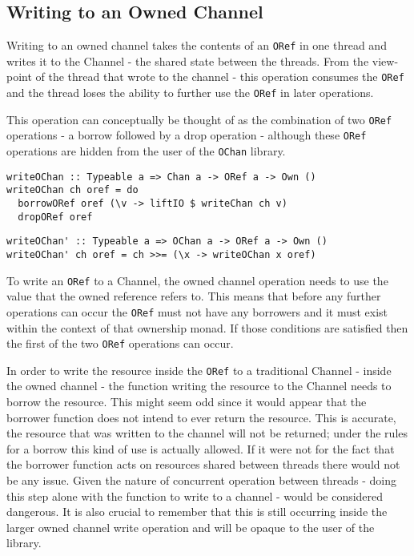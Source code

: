 \documentclass[onehalf,11pt]{beavtex}
\begin{document}
\subsection{Writing to an Owned Channel}

Writing to an owned channel takes the contents of an \texttt{ORef} in
one thread and writes it to the Channel - the shared state between the threads.
From the view-point of the thread that wrote to the channel - this operation
consumes the \texttt{ORef} and the thread loses the ability to further use the
\texttt{ORef} in later operations.

This operation can conceptually be thought of as the combination of two
\texttt{ORef} operations - a borrow followed by a drop operation -
although these \texttt{ORef} operations are hidden from the user of the
\texttt{OChan} library.

\begin{verbatim}
writeOChan :: Typeable a => Chan a -> ORef a -> Own ()
writeOChan ch oref = do
  borrowORef oref (\v -> liftIO $ writeChan ch v)
  dropORef oref
\end{verbatim}

\begin{verbatim}
writeOChan' :: Typeable a => OChan a -> ORef a -> Own ()
writeOChan' ch oref = ch >>= (\x -> writeOChan x oref)
\end{verbatim}

To write an \texttt{ORef} to a Channel, the owned channel operation
needs to use the value that the owned reference refers to.  This means
that before any further operations can occur the \texttt{ORef} must not have any
borrowers and it must exist within the context of that ownership monad.
If those conditions are satisfied then the first of the two \texttt{ORef}
operations can occur.

In order to write the resource inside the \texttt{ORef} to a traditional Channel
- inside the owned channel - the function writing the resource to the
Channel needs to borrow the resource.
This might seem odd since it would appear that the borrower function does not
intend to ever return the resource.  This is accurate, the resource that was
written to the channel will not be returned; under the rules for a
borrow this kind of use is actually allowed.  If it were not for the fact that
the borrower function acts on resources shared between threads there would not be
any issue.  Given the nature of concurrent operation between threads - doing
this step alone with the function to write to a channel - would be considered
dangerous.  It is also crucial to remember that this is still occurring inside
the larger owned channel write operation and will be opaque to the user
of the library.
\end{document}
